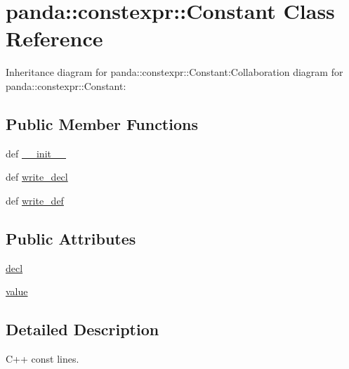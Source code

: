 \hypertarget{classpanda_1_1constexpr_1_1Constant}{
\section{panda::constexpr::Constant Class Reference}
\label{classpanda_1_1constexpr_1_1Constant}
}
Inheritance diagram for panda::constexpr::Constant:Collaboration diagram for panda::constexpr::Constant:\subsection*{Public Member Functions}
\begin{DoxyCompactItemize}
\item 
def \hyperlink{classpanda_1_1constexpr_1_1Constant_a8a0fd30cc60b1b7c7a361431c6886971}{\_\-\_\-init\_\-\_\-}
\item 
def \hyperlink{classpanda_1_1constexpr_1_1Constant_a14c963cd2fd6ce0149d3072a9e28d4a0}{write\_\-decl}
\item 
def \hyperlink{classpanda_1_1constexpr_1_1Constant_ac3ab9be69e5deb637e561c564b65fdba}{write\_\-def}
\end{DoxyCompactItemize}
\subsection*{Public Attributes}
\begin{DoxyCompactItemize}
\item 
\hyperlink{classpanda_1_1constexpr_1_1Constant_ad40a99b9a746ab01ea61e0bbc928023a}{decl}
\item 
\hyperlink{classpanda_1_1constexpr_1_1Constant_af29cb0e1ca9b7f9b18807ccf1ad94a5c}{value}
\end{DoxyCompactItemize}


\subsection{Detailed Description}
\begin{DoxyVerb}
C++ const lines.
\end{DoxyVerb}
 

